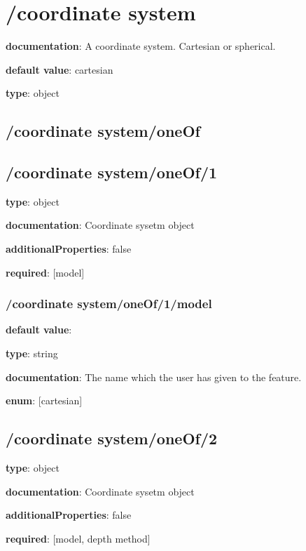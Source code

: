 \begin{itemized}
\end{itemized}\section{/coordinate system} \begin{itemized}
\item {\bf documentation}: A coordinate system. Cartesian or spherical.
\item {\bf default value}: cartesian
\item {\bf type}: object
\end{itemized}\subsection{/coordinate system/oneOf} \begin{itemized}
\end{itemized}\subsection{/coordinate system/oneOf/1} \begin{itemized}
\item {\bf type}: object
\item {\bf documentation}: Coordinate sysetm object
\item {\bf additionalProperties}: false
\item {\bf required}: [model]\end{itemized}
\subsubsection{/coordinate system/oneOf/1/model} \begin{itemized}
\item {\bf default value}: 
\item {\bf type}: string
\item {\bf documentation}: The name which the user has given to the feature.
\item {\bf enum}: [cartesian]\end{itemized}\subsection{/coordinate system/oneOf/2} \begin{itemized}
\item {\bf type}: object
\item {\bf documentation}: Coordinate sysetm object
\item {\bf additionalProperties}: false
\item {\bf required}: [model, depth method]\end{itemized}
